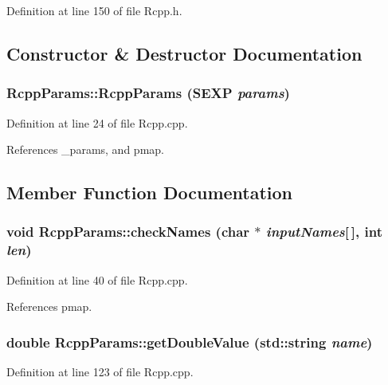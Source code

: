 Definition at line 150 of file Rcpp.h.

\subsection{Constructor \& Destructor Documentation}
\hypertarget{classRcppParams_7315d083ee0d1d0ca00c3aad0175d524}{
\subsubsection[RcppParams]{\setlength{\rightskip}{0pt plus 5cm}RcppParams::RcppParams (SEXP {\em params})}}
\label{classRcppParams_7315d083ee0d1d0ca00c3aad0175d524}




Definition at line 24 of file Rcpp.cpp.

References \_\-params, and pmap.

\subsection{Member Function Documentation}
\hypertarget{classRcppParams_1b8feaf39d3ffdf0f6773c44ac53736c}{
\subsubsection[checkNames]{\setlength{\rightskip}{0pt plus 5cm}void RcppParams::checkNames (char $\ast$ {\em inputNames}\mbox{[}$\,$\mbox{]}, \/  int {\em len})}}
\label{classRcppParams_1b8feaf39d3ffdf0f6773c44ac53736c}




Definition at line 40 of file Rcpp.cpp.

References pmap.\hypertarget{classRcppParams_a45f8bc1cd8a64aa9a98e24158407077}{
\subsubsection[getDoubleValue]{\setlength{\rightskip}{0pt plus 5cm}double RcppParams::getDoubleValue (std::string {\em name})}}
\label{classRcppParams_a45f8bc1cd8a64aa9a98e24158407077}




Definition at line 123 of file Rcpp.cpp.

